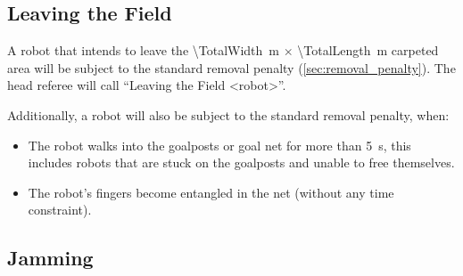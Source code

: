 \subsection{Leaving the Field}
\label{sec:leaving_field}

A robot that intends to leave the \qty{\TotalWidth}{\metre} $\times$ \qty{\TotalLength}{\metre} carpeted area will be subject to the standard removal penalty (\cf \cref{sec:removal_penalty}).
The head referee will call ``Leaving the Field \textless robot\textgreater''.

Additionally, a robot will also be subject to the standard removal penalty, when:
\begin{itemize}
  \item The robot walks into the goalposts or goal net for more than \qty{5}{\second}, this includes robots that are stuck on the goalposts and unable to free themselves.
  \item The robot's fingers become entangled in the net (without any time constraint).
\end{itemize}

\subsection{Jamming}
\label{sec:jamming}

